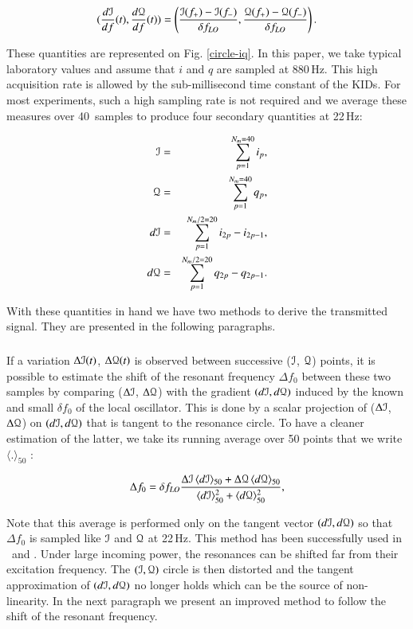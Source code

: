 \begin{equation}
\label{gradient}
(\frac{d\mathcal{I}}{df}(t), \frac{d\mathcal{Q}}{df}(t)) =
\left(\frac{\mathcal{I}(f_{+}) - \mathcal{I}(f_{-})}{\delta f_{LO}},
\frac{\mathcal{Q}(f_{+}) - \mathcal{Q}(f_{-})}{\delta f_{LO}}\right).
\end{equation}

These quantities are represented on Fig. \ref{circle-iq}. In this paper, we take
typical laboratory values and assume that $i$ and $q$ are sampled at
880\,Hz. This high acquisition rate is allowed by the sub-millisecond time
constant of the KIDs. For most experiments, such a high sampling rate is not
required and we average these measures over 40~samples to produce
four secondary quantities at 22\,Hz:

\begin{eqnarray}
\mathcal{I}  &=& \sum^{N_{m}=40}_{p=1} i_{p},\\
\mathcal{Q}  &=& \sum^{N_{m}=40}_{p=1} q_{p},\\
d\mathcal{I} &=& \sum^{N_{m}/2=20}_{p=1} i_{2p} - i_{2p-1},\\
d\mathcal{Q} &=& \sum^{N_{m}/2=20}_{p=1} q_{2p} - q_{2p-1}.
\end{eqnarray}

With these quantities in hand we have two methods to derive the transmitted
signal. They are presented in the following paragraphs.

\subsubsection{\methodu}
If a variation $\Delta\mathcal{I}(t)$, $\Delta\mathcal{Q}(t)$ is observed between successive ($\mathcal{I}$,
$\mathcal{Q}$) points, it is possible to estimate the shift of the resonant frequency
$\Delta f_{0}$ between these two samples by comparing ($\Delta \mathcal{I}$, $\Delta \mathcal{Q}$)
with the gradient $(d\mathcal{I},d\mathcal{Q})$ induced by the known and small $\delta
f_{0}$ of the local oscillator. This is done by a scalar projection of ($\Delta\mathcal{I}$,
$\Delta\mathcal{Q}$) on $(d\mathcal{I},d\mathcal{Q})$ that is tangent to the resonance circle. To have a
cleaner estimation of the latter, we take its running average over 50
points that we write $\langle . \rangle_{50}$ \citep{2014A&A...569A...9C}:

\begin{equation}
\label{eq:Rf}
\Delta f_{0} = \delta f_{LO} \frac{\Delta \mathcal{I}\, \langle d\mathcal{I}
  \rangle_{50}
+ \Delta \mathcal{Q}\, \langle d\mathcal{Q} \rangle_{50}}{\langle d\mathcal{I}
  \rangle_{50}^{2}
 + \langle d\mathcal{Q} \rangle_{50}^{2}},
\end{equation}

Note that this average is performed only on the tangent vector $(d\mathcal{I},d\mathcal{Q})$ so
that $\Delta f_0$ is sampled like $\mathcal{I}$ and $\mathcal{Q}$ at 22\,Hz. This method has been
successfully used in \nika\ and . Under large incoming power, the resonances can be shifted far from their excitation frequency. The $(\mathcal{I}, \mathcal{Q})$ circle is then distorted and the tangent approximation of $(d\mathcal{I}, d\mathcal{Q})$ no longer holds which can be the source of non-linearity. In the next paragraph we present an improved method to follow the shift of the resonant frequency.

